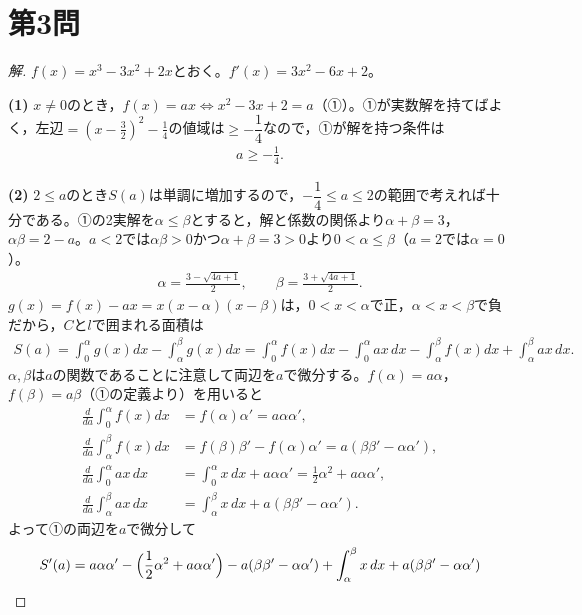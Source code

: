 \documentclass[../main.tex]{subfiles}
\begin{document}
\newpage

\section*{第3問}

\begin{proof}[解]
  $f(x)=x^3-3x^2+2x$とおく。$f'(x)=3x^2-6x+2$。

  \textbf{(1)} $x\neq0$のとき，$f(x)=ax\iff x^2-3x+2=a$（①）。①が実数解を持てばよく，左辺$=(x-\frac32)^2-\frac14$の値域は$\ge-\dfrac14$なので，①が解を持つ条件は
  \begin{align*}
    a\ge-\frac14.
  \end{align*}

  \textbf{(2)} $2\le a$のとき$S(a)$は単調に増加するので，$-\dfrac14\le a\le2$の範囲で考えれば十分である。①の2実解を$\alpha\le\beta$とすると，解と係数の関係より$\alpha+\beta=3$，$\alpha\beta=2-a$。$a<2$では$\alpha\beta>0$かつ$\alpha+\beta=3>0$より$0<\alpha\le\beta$（$a=2$では$\alpha=0$）。
  \begin{align*}
    \alpha=\frac{3-\sqrt{4a+1}}2,\qquad\beta=\frac{3+\sqrt{4a+1}}2.
  \end{align*}
  $g(x)=f(x)-ax=x(x-\alpha)(x-\beta)$は，$0<x<\alpha$で正，$\alpha<x<\beta$で負だから，$C$と$l$で囲まれる面積は
  \begin{align*}
    S(a)=\int_0^\alpha g(x)dx-\int_\alpha^\beta g(x)dx=\int_0^\alpha f(x)dx-\int_0^\alpha ax\,dx-\int_\alpha^\beta f(x)dx+\int_\alpha^\beta ax\,dx.\tag{①}
  \end{align*}
  $\alpha,\beta$は$a$の関数であることに注意して両辺を$a$で微分する。$f(\alpha)=a\alpha$，$f(\beta)=a\beta$（①の定義より）を用いると
  \begin{align*}
    \frac d{da}\int_0^\alpha f(x)dx&=f(\alpha)\alpha'=a\alpha\alpha',\\
    \frac d{da}\int_\alpha^\beta f(x)dx&=f(\beta)\beta'-f(\alpha)\alpha'=a(\beta\beta'-\alpha\alpha'),\\
    \frac d{da}\int_0^\alpha ax\,dx&=\int_0^\alpha x\,dx+a\alpha\alpha'=\frac12\alpha^2+a\alpha\alpha',\\
    \frac d{da}\int_\alpha^\beta ax\,dx&=\int_\alpha^\beta x\,dx+a(\beta\beta'-\alpha\alpha').
  \end{align*}
  よって①の両辺を$a$で微分して
  \begin{align*}
    S'(a)&=a\alpha\alpha'-\Bigl(\frac12\alpha^2+a\alpha\alpha'\Bigr)-a(\beta\beta'-\alpha\alpha')+\int_\alpha^\beta x\,dx+a(\beta\beta'-\alpha\alpha')\\

\end{align*}
\end{proof}
\end{document}
